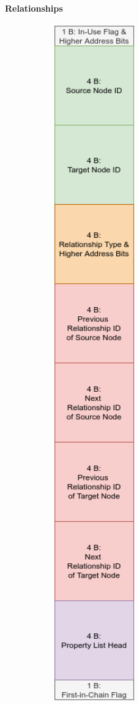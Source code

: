                 
            
            \paragraph{Relationships}
                \begin{figure}[htp]\label{rel_record}
                    \begin{center}
                        \includegraphics[keepaspectratio,height=0.9\textheight,width=0.5\textwidth]{img/03_record/relationship/relationship_record.png}

\end{center}
\end{figure}
